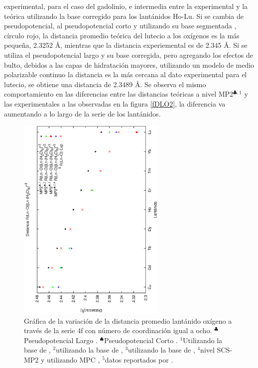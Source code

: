 experimental, para el caso del gadolinio, e intermedia entre la 
experimental y la te\'orica utilizando la base corregido para los 
lant\'anidos Ho-Lu. Si se cambia de pseudopotencial, al 
pseudopotencial corto \citep{Cao2001} y utilizando su base segmentada
\citep{Cao2002}, c\'irculo rojo, la distancia promedio te\'orica del 
lutecio a los ox\'igenos es la m\'as peque\~na, 2.3252 \AA, mientras 
que la distancia experiemental es de 2.345 \AA. Si se utiliza el 
pseudopotencial largo y su base corregida, pero agregando los efectos
de bulto, debidos a las capas de hidrataci\'on mayores, utilizando un
modelo de medio polarizable continuo la distancia es la m\'as cercana
al dato experimental para el lutecio, se obtiene una distancia de 
2.3489 \AA. Se observa el mismo comportamiento en las diferencias 
entre las distancias te\'oricas a nivel MP2$^{\clubsuit,1}$ y las 
experimentales a las observadas en la figura \ref{fDLO2}, la 
diferencia va aumentando a lo largo de la serie de los lant\'anidos.
\begin{figure}[h]
\centering
\includegraphics[height=10cm,angle=-90]{Graficas/lnO9dist3.ps}
\caption{\small{Gr\'afica de la variaci\'on de la distancia promedio
lant\'anido ox\'igeno a trav\'es de la serie 4f con n\'umero de 
coordinaci\'on igual a ocho. $^{\clubsuit}$Pseudopotencial Largo
\citep{Dolg1989}. $^{\spadesuit}$Pseudopotencial Corto 
\citep{Cao2001}. $^1$Utilizando la base de \cite{Dolg1993}}, 
$^2$utilizando la base de \cite{Yang2005}, $^3$utilizando la base de
\cite{Cao2002}, $^4$nivel SCS-MP2 \citep{Grim2003} y utilizando MPC 
\citep{Toma2005}, $^5$datos reportados por \cite{Dang2012}.}
\label{fDLO3}
\end{figure}

